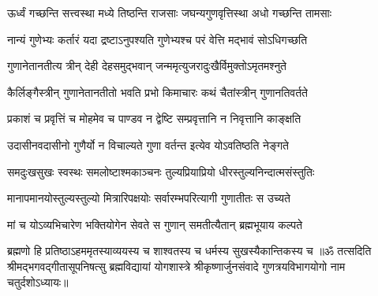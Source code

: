 \twolineshloka
{ऊर्ध्वं गच्छन्ति सत्त्वस्था मध्ये तिष्ठन्ति राजसाः}
{जघन्यगुणवृत्तिस्था अधो गच्छन्ति तामसाः}%

\twolineshloka
{नान्यं गुणेभ्यः कर्तारं यदा द्रष्टाऽनुपश्यति}
{गुणेभ्यश्च परं वेत्ति मद्भावं सोऽधिगच्छति}%

\twolineshloka
{गुणानेतानतीत्य त्रीन् देही देहसमुद्भवान्}
{जन्ममृत्युजरादुःखैर्विमुक्तोऽमृतमश्नुते}%

\twolineshloka
{कैर्लिङ्गैस्त्रीन् गुणानेतानतीतो भवति प्रभो}
{किमाचारः कथं चैतांस्त्रीन् गुणानतिवर्तते}%

\twolineshloka
{प्रकाशं च प्रवृत्तिं च मोहमेव च पाण्डव}
{न द्वेष्टि सम्प्रवृत्तानि न निवृत्तानि काङ्क्षति}%

\twolineshloka
{उदासीनवदासीनो गुणैर्यो न विचाल्यते}
{गुणा वर्तन्त इत्येव योऽवतिष्ठति नेङ्गते}%

\twolineshloka
{समदुःखसुखः स्वस्थः समलोष्टाश्मकाञ्चनः}
{तुल्यप्रियाप्रियो धीरस्तुल्यनिन्दात्मसंस्तुतिः}%

\twolineshloka
{मानापमानयोस्तुल्यस्तुल्यो मित्रारिपक्षयोः}
{सर्वारम्भपरित्यागी गुणातीतः स उच्यते}%

\twolineshloka
{मां च योऽव्यभिचारेण भक्तियोगेन सेवते}
{स गुणान् समतीत्यैतान् ब्रह्मभूयाय कल्पते}%

\twolineshloka
{ब्रह्मणो हि प्रतिष्ठाऽहममृतस्याव्ययस्य च}
{शाश्वतस्य च धर्मस्य सुखस्यैकान्तिकस्य च}%
{॥ॐ तत्सदिति श्रीमद्भगवद्गीतासूपनिषत्सु ब्रह्मविद्यायां योगशास्त्रे श्रीकृष्णार्जुनसंवादे गुणत्रयविभागयोगो नाम चतुर्दशोऽध्यायः॥}